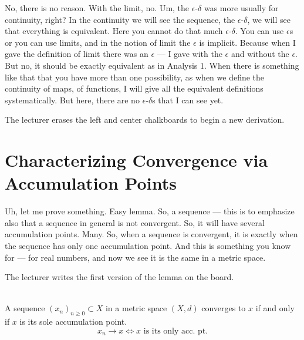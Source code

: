 \begin{spoken-clean}[00:02:12 - 00:03:12]
No, there is no reason. With the limit, no. Um, the $\epsilon$-$\delta$ was more usually for continuity, right? In the continuity we will see the sequence, the $\epsilon$-$\delta$, we will see that everything is equivalent. Here you cannot do that much $\epsilon$-$\delta$. You can use $\epsilon$s or you can use limits, and in the notion of limit the $\epsilon$ is implicit. Because when I gave the definition of limit there was an $\epsilon$ — I gave with the $\epsilon$ and without the $\epsilon$. But no, it should be exactly equivalent as in Analysis 1. When there is something like that that you have more than one possibility, as when we define the continuity of maps, of functions, I will give all the equivalent definitions systematically. But here, there are no $\epsilon$-$\delta$s that I can see yet.
\end{spoken-clean}

\begin{meta-note}[Transition]
The lecturer erases the left and center chalkboards to begin a new derivation.
\end{meta-note}

\section{Characterizing Convergence via Accumulation Points}

\begin{spoken-clean}[00:03:13 - 00:05:03]
Uh, let me prove something. Easy lemma. So, a sequence — this is to emphasize also that a sequence in general is not convergent. So, it will have several accumulation points. Many. So, when a sequence is convergent, it is exactly when the sequence has only one accumulation point. And this is something you know for — for real numbers, and now we see it is the same in a metric space.
\end{spoken-clean}

\begin{math-stroke}
\begin{nice-box}
The lecturer writes the first version of the lemma on the board.
\end{nice-box}
\begin{lemma}\label{lem:convergence-acc-point-v1}
\textcolor{red}{} \\
A sequence $(x_n)_{n \ge 0} \subset X$ in a metric space $(X, d)$ converges to $x$ if and only if $x$ is its sole accumulation point.
\[ x_n \to x \iff x \text{ is its only acc. pt.} \]
\end{lemma}
\end{math-stroke}

